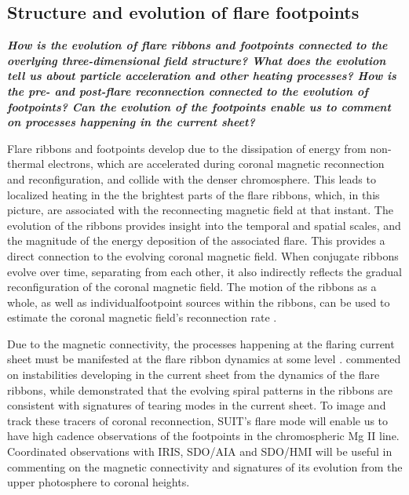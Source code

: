 \documentclass{article}
\begin{document}
\subsection{Structure and evolution of flare footpoints}

\textit{\textbf{How is the evolution of flare ribbons and footpoints connected to the overlying three-dimensional field structure? What does the evolution tell us about particle acceleration and other heating processes? How is the pre- and post-flare reconnection connected to the evolution of footpoints? Can the evolution of the footpoints enable us to comment on processes happening in the current sheet?}}

\vspace{0.2in}
Flare ribbons and footpoints develop due to the dissipation of energy from non-thermal electrons, which are accelerated during coronal magnetic reconnection and reconfiguration, and collide with the denser chromosphere. This leads to localized heating in the the brightest parts of the flare ribbons, which, in this picture, are associated with the reconnecting magnetic field at that instant. The evolution of the ribbons provides insight into the temporal and spatial scales, and the magnitude of the energy deposition of the associated flare. This provides a direct connection to the evolving coronal magnetic field. When conjugate ribbons evolve over time, separating from each other, it also indirectly reflects the gradual reconfiguration of the coronal magnetic field. The motion of the ribbons as a whole, as well as individualfootpoint sources within the ribbons, can be used to estimate the coronal magnetic field's reconnection rate \citep{isobe02,qiu02,fletcher09,liu18,qiu22,canon23}. 

Due to the magnetic connectivity, the processes happening at the flaring current sheet must be manifested at the flare ribbon dynamics at some level \citep{forbes2000, naus22, juraj19, sindhuja19, brannon15}. \cite{french21} commented on instabilities developing in the current sheet from the dynamics of the flare ribbons, while \citep{2021ApJ...920..102W}  demonstrated that the evolving spiral patterns in the ribbons are consistent with signatures of tearing modes in the current sheet. To image and track these tracers of coronal reconnection, SUIT's flare mode will enable us to have high cadence observations of the footpoints in the chromospheric Mg II line. Coordinated observations with IRIS, SDO/AIA and SDO/HMI will be useful in commenting on the magnetic connectivity and signatures of its evolution from the upper photosphere to coronal heights. 
\end{document}

